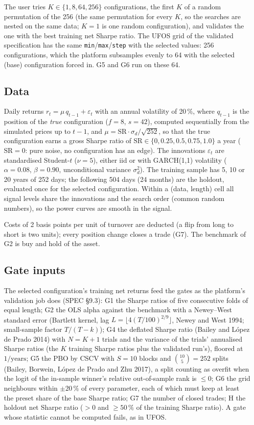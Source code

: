 \documentclass[11pt,a4paper]{article}
\begin{document}
The user tries $K \in \{1, 8, 64, 256\}$ configurations, the first $K$ of a random permutation of the 256
(the same permutation for every $K$, so the searches are nested on the same data; $K = 1$ is one random
configuration), and validates the one with the best training net Sharpe ratio. The UFOS grid of the
validated specification has the same \texttt{min}/\texttt{max}/\texttt{step} with the selected values: 256
configurations, which the platform subsamples evenly to 64 with the selected (base) configuration forced
in. G5 and G6 run on these 64.

\subsection{Data}
Daily returns $r_t = \mu\, q_{t-1} + \varepsilon_t$ with an annual volatility of 20\,\%, where $q_{t-1}$ is
the position of the \emph{true} configuration ($f = 8$, $s = 42$), computed sequentially from the
simulated prices up to $t-1$, and $\mu = \mathrm{SR}\cdot\sigma_d/\sqrt{252}$, so that the true configuration
earns a gross Sharpe ratio of $\mathrm{SR} \in \{0, 0.25, 0.5, 0.75, 1.0\}$ a year ($\mathrm{SR} = 0$:
pure noise, no configuration has an edge). The innovations $\varepsilon_t$ are standardised Student-$t$
($\nu = 5$), either iid or with GARCH(1,1) volatility ($\alpha = 0.08$, $\beta = 0.90$, unconditional
variance $\sigma_d^2$). The training sample has 5, 10 or 20 years of 252 days; the following 504 days (24
months) are the holdout, evaluated once for the selected configuration. Within a (data, length) cell all
signal levels share the innovations and the search order (common random numbers), so the power curves are
smooth in the signal.

Costs of 2 basis points per unit of turnover are deducted (a flip from long to short is two units); every
position change closes a trade (G7). The benchmark of G2 is buy and hold of the asset.

\subsection{Gate inputs}
The selected configuration's training net returns feed the gates as the platform's validation job does
(SPEC \S 9.3): G1 the Sharpe ratios of five consecutive folds of equal length; G2 the OLS alpha against the
benchmark with a Newey--West standard error (Bartlett kernel, lag $L = \lfloor 4 (T/100)^{2/9} \rfloor$,
Newey and West 1994; small-sample factor $T/(T-k)$); G4 the deflated Sharpe ratio (Bailey and L\'opez de
Prado 2014) with $N = K + 1$ trials and the variance of the trials' annualised Sharpe ratios (the $K$
training Sharpe ratios plus the validated run's), floored at $1/\text{years}$; G5 the PBO by CSCV with
$S = 10$ blocks and $\binom{10}{5} = 252$ splits (Bailey, Borwein, L\'opez de Prado and Zhu 2017), a split
counting as overfit when the logit of the in-sample winner's relative out-of-sample rank is $\le 0$; G6
the grid neighbours within $\pm 20\,\%$ of every parameter, each of which must keep at least the preset
share of the base Sharpe ratio; G7 the number of closed trades; H the holdout net Sharpe ratio ($> 0$ and
$\ge 50\,\%$ of the training Sharpe ratio). A gate whose statistic cannot be computed fails, as in UFOS.
\end{document}
